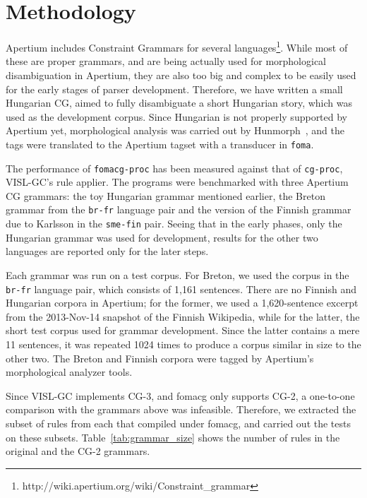 \documentclass{article}
\begin{document}

\section{Methodology}
\label{sec:methodology}

Apertium includes Constraint Grammars for several
languages\footnote{http://wiki.apertium.org/wiki/Constraint\_grammar}. While
most of these are proper grammars, and are being actually used for morphological
disambiguation in Apertium, they are also too big and complex to be easily used
for the early stages of parser development. Therefore, we have written a small
Hungarian CG, aimed to fully disambiguate a short Hungarian story, which was used
as the development corpus. Since Hungarian is not properly supported by Apertium
yet, morphological analysis was carried out by Hunmorph~\cite{Tron:2005}, and
the tags were translated to the Apertium tagset with a transducer in \texttt{foma}.

The performance of \texttt{fomacg-proc} has been measured against that of
\texttt{cg-proc}, VISL-GC's rule applier. The programs were benchmarked with
three Apertium CG grammars: the toy Hungarian grammar mentioned earlier, the
Breton grammar from the \texttt{br-fr} language pair and the version of the
Finnish grammar due to Karlsson in the \texttt{sme-fin} pair. %
Seeing that in the early phases, only the Hungarian grammar was used for
development, results for the other two languages are reported only for the later
steps.

Each grammar was run on a test corpus. For Breton, we used the corpus
in the \texttt{br-fr} language pair, which consists of 1,161 sentences. There
are no Finnish and Hungarian corpora in Apertium; for the former, we used a
1,620-sentence excerpt from the 2013-Nov-14 snapshot of the Finnish Wikipedia,
while for the latter, the short test corpus used for grammar development. Since
the latter contains a mere 11 sentences, it was repeated 1024 times to produce
a corpus similar in size to the other two. The Breton and Finnish corpora
were tagged by Apertium's morphological analyzer tools.

Since VISL-GC implements CG-3, and fomacg only supports CG-2, a one-to-one
comparison with the grammars above was infeasible. Therefore, we extracted the
subset of rules from each that compiled under fomacg, and carried out the tests
on these subsets. Table~\ref{tab:grammar_size} shows the number of rules in the
original and the CG-2 grammars.
\end{document}
